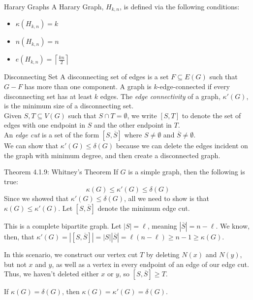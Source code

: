 \documentclass[10pt]{extarticle}
\begin{document}
  \begin{problem}{Harary Graphs}
    A Harary Graph, $H_{k,n}$, is defined via the following conditions:
    \begin{itemize}
      \item $\kappa(H_{k,n}) = k$
      \item $n(H_{k,n}) = n$
      \item $e(H_{k,n}) = \left\lceil \frac{kn}{2}\right\rceil$
    \end{itemize}
  \end{problem}
  \begin{problem}{Disconnecting Set}
    A disconnecting set of edges is a set $F\subseteq E(G)$ such that $G-F$ has more than one component. A graph is $k$-edge-connected if every disconnecting set has at least $k$ edges. The \textit{edge connectivity} of a graph, $\kappa'(G)$, is the minimum size of a disconnecting set.\\

    Given $S,T\subseteq V(G)$ such that $S\cap T = \emptyset$, we write $[S,T]$ to denote the set of edges with one endpoint in $S$ and the other endpoint in $T$.\\

    An \textit{edge cut} is a set of the form $[S,\overline{S}]$ where $S \neq \emptyset$ and $\overline{S} \neq \emptyset$. \\

    We can show that $\kappa'(G) \leq \delta(G)$ because we can delete the edges incident on the graph with minimum degree, and then create a disconnected graph.
  \end{problem}
  \begin{problem}{Theorem 4.1.9: Whitney's Theorem}
    If $G$ is a simple graph, then the following is true:
    \[
      \kappa(G) \leq \kappa'(G) \leq \delta(G)
    \] 
    \tcblower
    Since we showed that $\kappa'(G) \leq \delta(G)$, all we need to show is that $\kappa(G) \leq \kappa'(G)$. Let $[S,\overline{S}]$ denote the minimum edge cut.
    \begin{description}[font=\normalfont\scshape]
      \item[Case 1, $\forall x\in S, \forall y\in \overline{S}, x\leftrightarrow y$:] This is a complete bipartite graph. Let $|S| = \ell$, meaning $|\overline{S}| = n-\ell$. We know, then, that $\kappa'(G) = |[S,\overline{S}]| = |S||\overline{S}| = \ell(n-\ell) \geq n-1 \geq \kappa(G)$.
      \item[Case 2, $\exists x\in S, y\in \overline{S} \ni x\not\leftrightarrow y$:] In this scenario, we construct our vertex cut $T$ by deleting $N(x)$ and $N(y)$, but not $x$ and $y$, as well as a vertex in every endpoint of an edge of our edge cut. Thus, we haven't deleted either $x$ or $y$, so $[S,\overline{S}] \geq T$.
    \end{description}
    If $\kappa(G) = \delta(G)$, then $\kappa(G) = \kappa'(G) = \delta(G)$.
  \end{problem}
\end{document}
